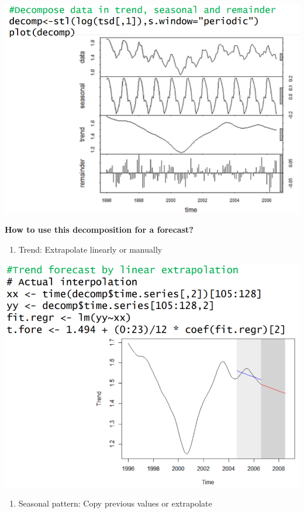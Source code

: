 \documentclass[
]{article}
\providecommand{\tightlist}{%
  \setlength{\itemsep}{0pt}\setlength{\parskip}{0pt}}
\begin{document}
\includegraphics[width=1\linewidth]{decomp}

\textbf{How to use this decomposition for a forecast?}

\begin{enumerate}
\def\labelenumi{\arabic{enumi}.}
\tightlist
\item
  Trend: Extrapolate linearly or manually
\end{enumerate}

\includegraphics[width=1\linewidth]{trend}

\begin{enumerate}
\def\labelenumi{\arabic{enumi}.}
\setcounter{enumi}{1}
\tightlist
\item
  Seasonal pattern: Copy previous values or extrapolate
\end{enumerate}
\end{document}
